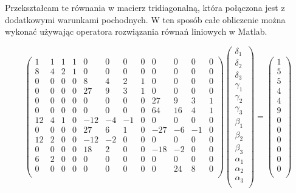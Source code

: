 \documentclass[varwidth,12pt,a4paper]{article}
\begin{document}
Przekształcam te równania w macierz tridiagonalną, która połączona jest z dodatkowymi warunkami pochodnych. 
W ten sposób całe obliczenie można wykonać używając operatora rozwiązania równań liniowych w Matlab.


$$
\left( \begin{array}{cccccccccccc}
     1  &  1  &  1  &  1 &   0&    0&    0 &   0&    0&    0&    0&    0 \\
     8  &  4  &  2  &  1 &   0&    0&    0 &   0&    0&    0&    0&    0 \\
     0  &  0  &  0  &  0 &   8&    4&    2 &   1&    0&    0&    0&    0 \\
     0  &  0  &  0  &  0 &  27&    9&    3 &   1&    0&    0&    0&    0 \\
     0  &  0  &  0  &  0 &   0&    0&    0 &   0&   27&    9&    3&    1 \\
     0  &  0  &  0  &  0 &   0&    0&    0 &   0&   64&   16&    4&    1 \\
    12  &  4  &  1  &  0 & -12&   -4&   -1 &   0&    0&    0&    0&    0 \\
     0  &  0  &  0  &  0 &  27&    6&    1 &   0&  -27&   -6&   -1&    0 \\
    12  &  2  &  0  &  0 & -12&   -2&    0 &   0&    0&    0&    0&    0 \\
     0  &  0  &  0  &  0 &  18&    2&    0 &   0&  -18&   -2&    0&    0 \\
     6  &  2  &  0  &  0 &   0&    0&    0 &   0&    0&    0&    0&    0 \\
     0  &  0  &  0  &  0 &   0&    0&    0 &   0&    0&   24&    8&    0 \\
\end{array} \right) \left( \begin{array}{c}
\delta _1\\
\delta_2\\
\delta_3\\
\gamma _1\\
\gamma _2\\
\gamma_3\\
\beta _1\\
\beta _2\\
\beta _3\\
\alpha _1\\
\alpha _2\\
\alpha _3 \\
\end{array} \right) = \left( \begin{array}{c}
1 \\
5 \\
5 \\
4 \\
4 \\
9 \\
0 \\
0 \\
0 \\
0 \\
0 \\
0 \\
\end{array} \right) 
$$
\end{document}
